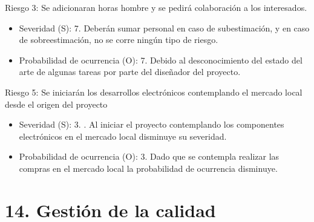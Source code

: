 \documentclass[11pt, %
codirector, %
]{charter}
\begin{document}
Riesgo 3: Se adicionaran horas hombre y se pedirá colaboración a los interesados.
\begin{itemize}
	\item Severidad (S): 7. \newline 
	Deberán sumar personal en caso de subestimación, y en caso de sobreestimación, no se corre ningún tipo de riesgo.
	\item Probabilidad de ocurrencia (O): 7.  \newline
	Debido al desconocimiento del estado del arte de algunas tareas por parte del diseñador del proyecto.  
\end{itemize}



Riesgo 5: Se iniciarán los desarrollos electrónicos contemplando el mercado local desde el origen del proyecto
\begin{itemize}
	\item Severidad (S): 3. \newline .
	Al iniciar el proyecto contemplando los componentes electrónicos en el mercado local disminuye su severidad. 
	\item Probabilidad de ocurrencia (O): 3.  \newline
	Dado que se contempla realizar las compras en el mercado local la probabilidad de ocurrencia disminuye. 
\end{itemize}




\section{14. Gestión de la calidad}
\label{sec:calidad}
\end{document}
